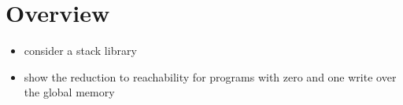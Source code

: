 \section{Overview}

\begin{itemize}
\item consider a stack library
\item show the reduction to reachability for programs with zero and one write over the global memory
\end{itemize}